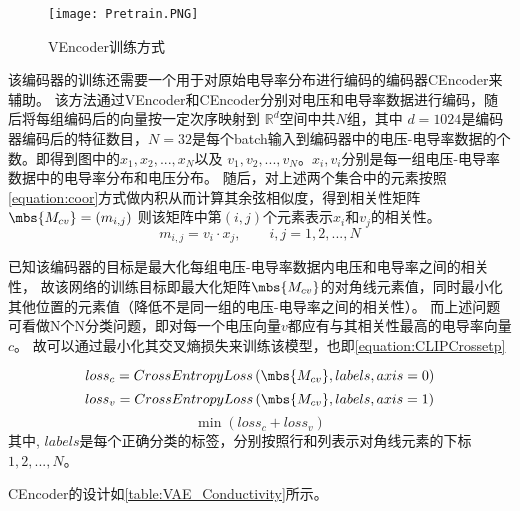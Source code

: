 \begin{figure}[H]
    \centering
    \texttt{[image: Pretrain.PNG]}
    \caption{VEncoder训练方式}
    \label{figure:Pretrain}
\end{figure}
该编码器的训练还需要一个用于对原始电导率分布进行编码的编码器CEncoder来辅助。
该方法通过VEncoder和CEncoder分别对电压和电导率数据进行编码，随后将每组编码后的向量按一定次序映射到 $\mathbb{R}^d$空间中共$N$组，其中
$d=1024$是编码器编码后的特征数目，$N=32$是每个batch输入到编码器中的电压-电导率数据的个数。即得到图中的$x_1, x_2,...,x_N$以及
$v_1, v_2,..., v_N$。$x_i,v_i$分别是每一组电压-电导率数据中的电导率分布和电压分布。
随后，对上述两个集合中的元素按照\cref{equation:coor}方式做内积从而计算其余弦相似度，得到相关性矩阵$\mbs{M_{cv}}= \left(m_{i,j}\right)$
则该矩阵中第$(i,j)$个元素表示$x_i$和$v_j$的相关性。
\begin{equation}
    \label{equation:coor}
    m_{i,j} = v_{i} \cdot x_{j}, \qquad i,j=1,2,...,N
\end{equation}


已知该编码器的目标是最大化每组电压-电导率数据内电压和电导率之间的相关性，
故该网络的训练目标即最大化矩阵$\mbs{M_{cv}}$的对角线元素值，同时最小化其他位置的元素值（降低不是同一组的电压-电导率之间的相关性）。
而上述问题可看做N个N分类问题，即对每一个电压向量$v$都应有与其相关性最高的电导率向量$c$。
故可以通过最小化其交叉熵损失来训练该模型，也即\cref{equation:CLIPCrossetp}

\begin{equation}
    loss_c = CrossEntropyLoss \left(\mbs{M_{cv}}, labels, axis=0\right)
\end{equation}
\begin{equation}
    loss_v = CrossEntropyLoss \left(\mbs{M_{cv}}, labels, axis=1\right)
\end{equation}
\begin{equation}
    \label{equation:CLIPCrossetp}
    \min \left(loss_c + loss_v\right)
\end{equation}
其中, $labels$是每个正确分类的标签，分别按照行和列表示对角线元素的下标$1,2,...,N$。

CEncoder的设计如\cref{table:VAE_Conductivity}所示。


